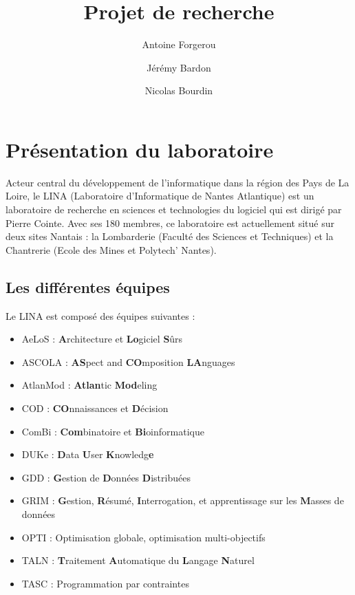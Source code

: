 \documentclass[12pt,a4paper]{report}
\title{Projet de recherche}
\author{Antoine Forgerou \and Jérémy Bardon \and Nicolas Bourdin}
\date{}
\begin{document}
	\renewcommand{\contentsname}{Sommaire}
	\maketitle	

	\tableofcontents	
	\newpage
	
	\setlength{\unitlength}{1cm}

\chapter{Présentation du laboratoire}
Acteur central du développement de l'informatique dans la région des Pays de La Loire, le LINA (Laboratoire d'Informatique de Nantes Atlantique) est un laboratoire de recherche en sciences et technologies du logiciel qui est dirigé par Pierre Cointe. Avec ses 180 membres, ce laboratoire est actuellement situé sur deux sites Nantais : la Lombarderie (Faculté des Sciences et Techniques) et la Chantrerie (Ecole des Mines et Polytech' Nantes).


\section{Les différentes équipes}
Le LINA est composé des équipes suivantes : 
\begin{itemize}
  \item AeLoS : \textbf{A}rchitecture et \textbf{Lo}giciel \textbf{S}ûrs
  \item ASCOLA : \textbf{AS}pect and \textbf{CO}mposition \textbf{LA}nguages
  \item AtlanMod : \textbf{Atlan}tic \textbf{Mod}eling 
  \item COD : \textbf{CO}nnaissances et \textbf{D}écision
  \item ComBi : \textbf{Com}binatoire et \textbf{Bi}oinformatique
  \item DUKe : \textbf{D}ata \textbf{U}ser \textbf{K}nowledg\textbf{e}
  \item GDD : \textbf{G}estion de \textbf{D}onnées \textbf{D}istribuées
  \item GRIM : \textbf{G}estion, \textbf{R}ésumé, \textbf{I}nterrogation, et apprentissage sur les \textbf{M}asses de données
  \item OPTI : Optimisation globale, optimisation multi-objectifs
  \item TALN : \textbf{T}raitement \textbf{A}utomatique du \textbf{L}angage \textbf{N}aturel
  \item TASC : Programmation par contraintes
\end{itemize}
\end{document}
